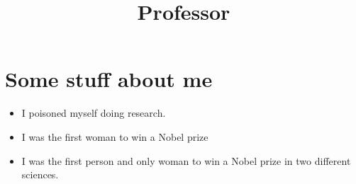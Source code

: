 \documentclass[11pt,a4paper,]{moderncv}
\title{Professor} %
\providecommand{\tightlist}{%
	\setlength{\itemsep}{0pt}\setlength{\parskip}{0pt}}
\begin{document}
\makecvtitle %



\hypertarget{some-stuff-about-me}{%
\section{Some stuff about me}\label{some-stuff-about-me}}

\begin{itemize}
\tightlist
\item
  I poisoned myself doing research.
\item
  I was the first woman to win a Nobel prize
\item
  I was the first person and only woman to win a Nobel prize in two different sciences.
\end{itemize}
\end{document}
